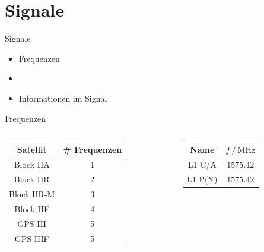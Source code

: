 \section{Signale}
\label{sec:signale}

\begin{frame}{Signale}
    \begin{itemize}
        \item Frequenzen
        \item[~] ~
        \item Informationen im Signal
    \end{itemize}
\end{frame}

\begin{frame}{Frequenzen}
    \begin{columns}
        \begin{column}{0.5\textwidth}
            \begin{table}
                \centering
                \begin{tabular}{c S[table-format=1.0]}
                    \toprule
                    {Satellit} & {\# Frequenzen} \\
                    \midrule
                    Block IIA   & 1 \\
                    Block IIR   & 2 \\
                    Block IIR-M & 3 \\
                    Block IIF   & 4 \\
                    GPS III     & 5 \\
                    GPS IIIF    & 5 \\
                    \bottomrule
                \end{tabular}
            \end{table}
        \end{column}
        \begin{column}{0.5\textwidth}
            \begin{table}
                \centering
                \begin{tabular}{c c}
                    \toprule
                    {Name} & {$f\:/\:\si{\mega\hertz}$} \\
                    \midrule
                    L1 C/A  & $\num{1575.42}$ \\
                    L1 P(Y) & $\num{1575.42}$ \\

\end{tabular}
\end{table}
\end{column}
\end{columns}
\end{frame}
